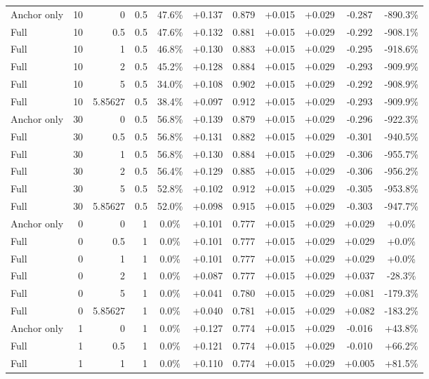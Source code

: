 \begin{table}[htbp]
\begin{tabular}{lrrrccccccc}
Anchor only & 10 & 0 & 0.5 & 47.6\% & +0.137 & 0.879 & +0.015 & +0.029 & -0.287 & -890.3\% \\
Full & 10 & 0.5 & 0.5 & 47.6\% & +0.132 & 0.881 & +0.015 & +0.029 & -0.292 & -908.1\% \\
Full & 10 & 1 & 0.5 & 46.8\% & +0.130 & 0.883 & +0.015 & +0.029 & -0.295 & -918.6\% \\
Full & 10 & 2 & 0.5 & 45.2\% & +0.128 & 0.884 & +0.015 & +0.029 & -0.293 & -909.9\% \\
Full & 10 & 5 & 0.5 & 34.0\% & +0.108 & 0.902 & +0.015 & +0.029 & -0.292 & -908.9\% \\
Full & 10 & 5.85627 & 0.5 & 38.4\% & +0.097 & 0.912 & +0.015 & +0.029 & -0.293 & -909.9\% \\
Anchor only & 30 & 0 & 0.5 & 56.8\% & +0.139 & 0.879 & +0.015 & +0.029 & -0.296 & -922.3\% \\
Full & 30 & 0.5 & 0.5 & 56.8\% & +0.131 & 0.882 & +0.015 & +0.029 & -0.301 & -940.5\% \\
Full & 30 & 1 & 0.5 & 56.8\% & +0.130 & 0.884 & +0.015 & +0.029 & -0.306 & -955.7\% \\
Full & 30 & 2 & 0.5 & 56.4\% & +0.129 & 0.885 & +0.015 & +0.029 & -0.306 & -956.2\% \\
Full & 30 & 5 & 0.5 & 52.8\% & +0.102 & 0.912 & +0.015 & +0.029 & -0.305 & -953.8\% \\
Full & 30 & 5.85627 & 0.5 & 52.0\% & +0.098 & 0.915 & +0.015 & +0.029 & -0.303 & -947.7\% \\
Anchor only & 0 & 0 & 1 & 0.0\% & +0.101 & 0.777 & +0.015 & +0.029 & +0.029 & +0.0\% \\
Full & 0 & 0.5 & 1 & 0.0\% & +0.101 & 0.777 & +0.015 & +0.029 & +0.029 & +0.0\% \\
Full & 0 & 1 & 1 & 0.0\% & +0.101 & 0.777 & +0.015 & +0.029 & +0.029 & +0.0\% \\
Full & 0 & 2 & 1 & 0.0\% & +0.087 & 0.777 & +0.015 & +0.029 & +0.037 & -28.3\% \\
Full & 0 & 5 & 1 & 0.0\% & +0.041 & 0.780 & +0.015 & +0.029 & +0.081 & -179.3\% \\
Full & 0 & 5.85627 & 1 & 0.0\% & +0.040 & 0.781 & +0.015 & +0.029 & +0.082 & -183.2\% \\
Anchor only & 1 & 0 & 1 & 0.0\% & +0.127 & 0.774 & +0.015 & +0.029 & -0.016 & +43.8\% \\
Full & 1 & 0.5 & 1 & 0.0\% & +0.121 & 0.774 & +0.015 & +0.029 & -0.010 & +66.2\% \\
Full & 1 & 1 & 1 & 0.0\% & +0.110 & 0.774 & +0.015 & +0.029 & +0.005 & +81.5\% \\

\end{tabular}
\end{table}
